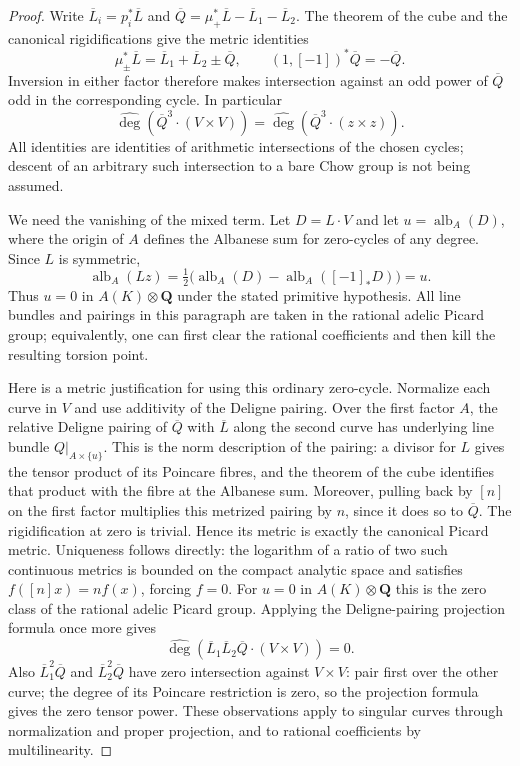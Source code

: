\documentclass[11pt,a4paper]{article}
\begin{document}
\begin{proof}
Write $\overline L_i=p_i^*\overline L$ and
$\overline Q=\mu_+^*\overline L-\overline L_1-\overline L_2$.
The theorem of the cube and the canonical rigidifications give the
metric identities
\[
 \mu_\pm^*\overline L=\overline L_1+\overline L_2\pm\overline Q,
 \qquad (1,[-1])^*\overline Q=-\overline Q.
\]
Inversion in either factor therefore makes intersection against an odd
power of $\overline Q$ odd in the corresponding cycle. In particular
\[
 \widehat{\deg}(\overline Q^3\cdot(V\times V))
 =\widehat{\deg}(\overline Q^3\cdot(z\times z)).             \tag{AR.35}
\]
All identities are identities of arithmetic intersections of the chosen
cycles; descent of an arbitrary such intersection to a bare Chow group
is not being assumed.

We need the vanishing of the mixed term. Let $D=L\cdot V$ and let
$u=\operatorname{alb}_A(D)$, where the origin of $A$ defines the
Albanese sum for zero-cycles of any degree. Since $L$ is symmetric,
\[
 \operatorname{alb}_A(Lz)
 =\tfrac12\bigl(\operatorname{alb}_A(D)
                    -\operatorname{alb}_A([-1]_*D)\bigr)=u.
\]
Thus $u=0$ in $A(K)\otimes\mathbf Q$ under the stated primitive
hypothesis. All line bundles and pairings in this paragraph are taken
in the rational adelic Picard group; equivalently, one can first clear
the rational coefficients and then kill the resulting torsion point.

Here is a metric justification for using this ordinary zero-cycle.
Normalize each curve in $V$ and use additivity of the Deligne pairing.
Over the first factor $A$, the relative Deligne pairing of
$\overline Q$ with $\overline L$ along the second curve has underlying
line bundle $Q|_{A\times\{u\}}$. This is the norm description of the
pairing: a divisor for $L$ gives the tensor product of its Poincare
fibres, and the theorem of the cube identifies that product with the
fibre at the Albanese sum. Moreover, pulling back by $[n]$ on the first
factor multiplies this metrized pairing by $n$, since it does so to
$\overline Q$. The rigidification at zero is trivial. Hence its metric
is exactly the canonical Picard metric. Uniqueness follows directly:
the logarithm of a ratio of two such continuous metrics is bounded on
the compact analytic space and satisfies $f([n]x)=n f(x)$, forcing
$f=0$. For $u=0$ in $A(K)\otimes\mathbf Q$ this is the zero class
of the rational adelic Picard group. Applying the
Deligne-pairing projection formula once more gives
\[
 \widehat{\deg}(\overline L_1\overline L_2\overline Q
                   \cdot(V\times V))=0.                   \tag{AR.36}
\]
Also $\overline L_1^2\overline Q$ and
$\overline L_2^2\overline Q$ have zero intersection against
$V\times V$: pair first over the other curve; the degree of its
Poincare restriction is zero, so the projection formula gives the
zero tensor power. These observations apply to singular curves through
normalization and proper projection, and to rational coefficients by
multilinearity.


\end{proof}
\end{document}
